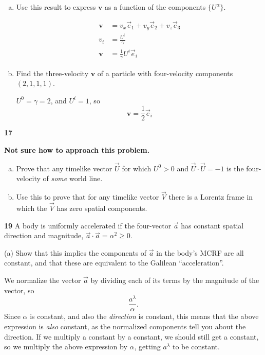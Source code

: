 \documentclass[gr-notes.tex]{subfiles}
\begin{document}
\begin{enumerate}[(a)]
\item Use this result to express $\boldsymbol{v}$ as a function of the components $\{ U^\alpha \}$.

\begin{align*}
  \boldsymbol{v} &=
  v_x \vec{e}_1 + v_y \vec{e}_2 + v_z \vec{e}_3
  \\
  v_i &= \frac{U^i}{\gamma}
  \\
  \boldsymbol{v} &= \frac{1}{\gamma} U^i \vec{e}_i
\end{align*}

\item Find the three-velocity $\boldsymbol{v}$ of a particle with four-velocity components $(2, 1, 1, 1)$.

$U^0 = \gamma = 2$, and $U^i = 1$, so
%
\begin{displaymath}
  \boldsymbol{v} = \frac{1}{2} \vec{e}_i
\end{displaymath}


\end{enumerate}


\textbf{17}

\textbf{Not sure how to approach this problem.}

\begin{enumerate}[(a)]
\item Prove that any timelike vector $\vec{U}$ for which $U^0 > 0$ and $\vec{U} \cdot \vec{U} = -1$ is the four-velocity of \emph{some} world line.


\item Use this to prove that for any timelike vector $\vec{V}$ there is a Lorentz frame in which the $\vec{V}$ has zero spatial components.
\end{enumerate}


\textbf{19}
A body is uniformly accelerated if the four-vector $\vec{a}$ has constant spatial direction and magnitude, $\vec{a} \cdot \vec{a} = \alpha^2 \geq 0$.

(a) Show that this implies the components of $\vec{a}$ in the body's MCRF are all constant, and that these are equivalent to the Galilean ``acceleration''.

We normalize the vector $\vec{a}$ by dividing each of its terms by the magnitude of the vector, so
%
\begin{displaymath}
  \frac{a^\lambda}{\alpha}.
\end{displaymath}
%
Since $\alpha$ is constant, and also the \emph{direction} is constant, this means that the above expression is \emph{also} constant, as the normalized components tell you about the direction. If we multiply a constant by a constant, we should still get a constant, so we multiply the above expression by $\alpha$, getting $a^\lambda$ to be constant.
\end{document}
